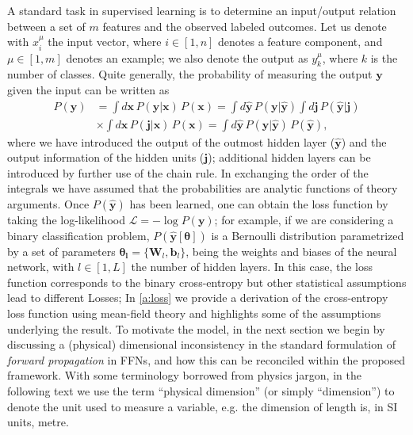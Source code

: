 \documentclass[5p]{elsarticle}
\begin{document}
A standard task in supervised learning is to determine an input/output relation between a set of $m$ features and the observed labeled outcomes. Let us denote with $x^{\mu}_i$ the input vector, where $i \in [1, n]$ denotes a feature component, and $\mu \in [1,m]$ denotes an example; we also denote the output as $y^{\mu}_k$, where $k$ is the number of classes. Quite generally, the probability of measuring the output $\mathbf{y}$ given the input can be written as
%
\begin{align} \label{eq:chain} \nonumber
P(\mathbf{y}) &= \int d\mathbf{x} \, P(\mathbf{y} | \mathbf{x}) \, P(\mathbf{x}) =   \int d \hat{\mathbf{y}}\,  P(\mathbf{y} | \hat{\mathbf{y}} ) \int d \mathbf{j}   \, P(\hat{\mathbf{y}}| \mathbf{j} )   \\
&\times \int d \mathbf{x} \, P(\mathbf{j} | \mathbf{x} ) \, P(\mathbf{x}) =  \int d \hat{\mathbf{y}} \, P(\mathbf{y} | \hat{\mathbf{y}} ) \, P(\hat{\mathbf{y}}),
\end{align}
%
 where we have introduced the output of the outmost hidden layer ($\hat{ \mathbf{y}}$) and the output information of the hidden units  ($\mathbf{j}$); additional hidden layers can be introduced by further use of the chain rule. In exchanging the order of the integrals we have assumed that the probabilities are analytic functions of theory arguments. Once $P(\hat{\mathbf{y}})$ has been learned, one can obtain the loss function by taking the log-likelihood $\mathscr{L} = - \log P(\mathbf{y})$; for example, if we are considering a binary classification problem, $P(\hat{\mathbf{y}}[\boldsymbol{\theta}])$ is a Bernoulli distribution parametrized by a set of parameters $\boldsymbol{\theta_l} = \{\mathbf{W}_l,\mathbf{ b}_l \}$, being the weights and biases of the neural network, with $l \in [1, L]$ the number of hidden layers. In this case, the loss function corresponds to the binary cross-entropy but other statistical assumptions lead to different Losses; In \eqref{a:loss} we provide a derivation of the cross-entropy loss function using mean-field theory and highlights some of the assumptions underlying the result. To motivate the model, in the next section we begin by discussing a (physical) dimensional inconsistency in the standard formulation of {\it forward propagation} in FFNs, and how this can be reconciled within the proposed framework. With some terminology borrowed from physics jargon, in the following text we use the term ``physical dimension''  (or simply ``dimension'') to denote the unit used to measure a variable, e.g. the dimension of length is, in SI units, metre.
\end{document}
